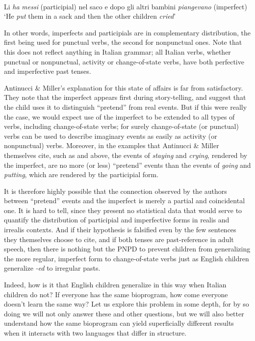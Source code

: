 \ea\label{ex:3:23}
\\
  Li \textit{ha} \textit{messi} (participial) nel saco e dopo gli altri bambini \textit{piangevano} (imperfect)\\ 
\glt `He \textit{put} them in a sack and then the other children \textit{cried}'
\z

\noindent In other words, imperfects and participials are in complementary distribution, the first being used for punctual verbs, the second for nonpunctual ones. Note that this does not reflect anything in Italian grammar; all Italian verbs, whether punctual or nonpunctual, activity or change-of-state verbs, have both perfective and imperfective past tenses.

Antinucci \& Miller's explanation for this state of affairs is far from satisfactory. They note that the imperfect appears first during story-telling, and suggest that the child uses it to distinguish ``pretend'' from real events. But if this were really the case, we would expect use of the imperfect to be extended to all types of verbs, including change-of-state verbs; for surely change-of-state (or punctual) verbs can be used to describe imaginary events as easily as activity (or nonpunctual) verbs. Moreover, in the examples that Antinucci \& Miller themselves cite, such as  and  above, the events of \textit{staying} and \textit{crying}, rendered by the imperfect, are no more (or less) ``pretend'' events than the events of \textit{going} and \textit{putting}, which are rendered by the participial form.


It is therefore highly possible that the connection observed by the authors between ``pretend'' events and the imperfect is merely a partial and coincidental one. It is hard to tell, since they present no statistical data that would serve to quantify the distribution of participial and imperfective forms in realis and irrealis contexts. And if their hypothesis is falsified even by the few sentences they themselves choose to cite, and if both tenses are past-reference in adult speech, then there is nothing but the PNPD to prevent children from generalizing the more regular, imperfect form to change-of-state verbs just as English children generalize \textit{-ed} to irregular pasts.

Indeed, how is it that English children generalize in this way when Italian children do not? If everyone has the same bioprogram, how come everyone doesn't learn the same way? Let us explore this problem in some depth, for by so doing we will not only answer these and other questions, but we will also better understand how the same bioprogram can yield superficially different results when it interacts with two languages that differ in structure.

